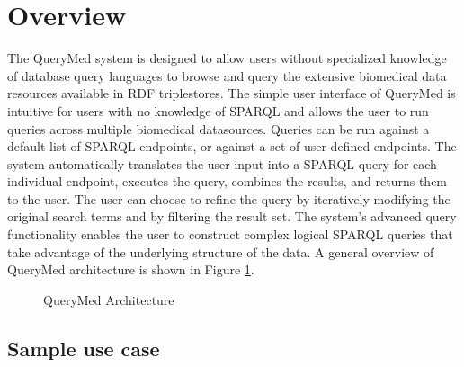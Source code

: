 \documentclass{acm_proc_article-sp}
\begin{document}


\section{Overview}

The QueryMed system is designed to allow users without specialized knowledge of database query languages to browse and query the extensive biomedical data resources available in RDF triplestores. The simple user interface of QueryMed is intuitive for users with no knowledge of SPARQL and allows the user to run queries across multiple biomedical datasources.  Queries can be run against a default list of SPARQL endpoints, or against a set of user-defined endpoints. The system automatically translates the user input into a SPARQL query for each individual endpoint, executes the query, combines the results, and returns them to the user.  The user can choose to refine the query by iteratively modifying the original search terms and by filtering the result set.  The system's advanced query functionality enables the user to construct complex logical SPARQL queries that take advantage of the underlying structure of the data.  A general overview of QueryMed architecture is shown in Figure \ref{fig:arch_details}.

\begin{figure}
\centering
{}
\caption{QueryMed Architecture}
\label{fig:arch_details}
\end{figure}

\subsection{Sample use case}
\end{document}
